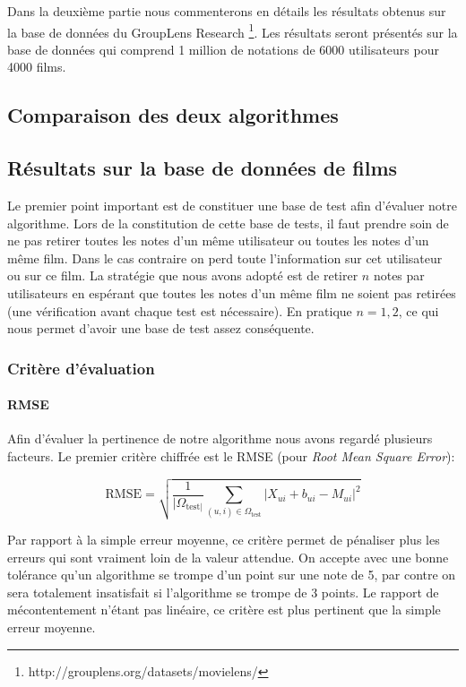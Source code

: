 \documentclass[10pt,a4paper]{article}
\begin{document}
 Dans la deuxième partie nous commenterons en détails les résultats obtenus sur la base de données du GroupLens Research \footnote{http://grouplens.org/datasets/movielens/}. Les résultats seront présentés sur la base de données qui comprend 1 million de notations de 6000 utilisateurs pour 4000 films. 

\subsection{Comparaison des deux algorithmes}


\subsection{Résultats sur la base de données de films}

Le premier point important est de constituer une base de test afin d'évaluer notre algorithme. Lors de la constitution de cette base de tests, il faut prendre soin de ne pas retirer toutes les notes d'un même utilisateur ou toutes les notes d'un même film. Dans le cas contraire on perd toute l'information sur cet utilisateur ou sur ce film. La stratégie que nous avons adopté est de retirer $n$ notes par utilisateurs en espérant que toutes les notes d'un même film ne soient pas retirées (une vérification avant chaque test est nécessaire). En pratique $n=1,2$, ce qui nous permet d'avoir une base de test assez conséquente.

\subsubsection*{Critère d'évaluation}

\paragraph{RMSE}

Afin d'évaluer la pertinence de notre algorithme nous avons regardé plusieurs facteurs. Le premier critère chiffrée est le RMSE (pour \textit{Root Mean Square Error}):

$$ \text{RMSE} = \sqrt{\frac{1}{|\Omega_{\text{test}|}}\sum_{(u,i)\in \Omega_{\text{test}}} |X_{ui}+b_{ui}-M_{ui}|^2} $$

Par rapport à la simple erreur moyenne, ce critère permet de pénaliser plus les erreurs qui sont vraiment loin de la  valeur attendue. On accepte avec une bonne tolérance qu'un algorithme se trompe d'un point sur une note de 5, par contre on sera totalement insatisfait si l'algorithme se trompe de 3 points. Le rapport de mécontentement n'étant pas linéaire, ce critère est plus pertinent que la simple erreur moyenne.
\end{document}
